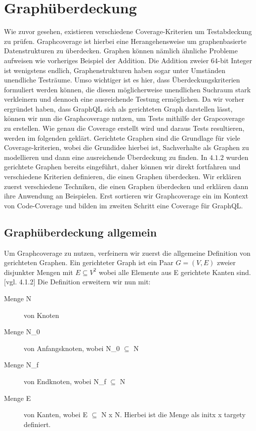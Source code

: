 \chapter{Graphüberdeckung}
\label{graphueberdeckung}

Wie zuvor gesehen, existieren verschiedene Coverage-Kriterien um Testabdeckung zu prüfen.
Graphcoverage ist hierbei eine Herangehensweise um graphenbasierte Datenstrukturen zu überdecken.
Graphen können nämlich ähnliche Probleme aufweisen wie vorheriges Beispiel der Addition.
Die Addition zweier 64-bit Integer ist wenigstens endlich, Graphenstrukturen haben sogar unter Umständen unendliche Testräume.
Umso wichtiger ist es hier, dass Überdeckungskriterien formuliert werden können, die diesen möglicherweise unendlichen Suchraum
stark verkleinern und dennoch eine ausreichende Testung ermöglichen.
Da wir vorher ergründet haben, dass GraphQL sich als gerichteten Graph darstellen lässt, können wir nun die Graphcoverage nutzen, um Tests mithilfe der Grapcoverage zu erstellen.
Wie genau die Coverage erstellt wird und daraus Tests resultieren, werden im folgenden geklärt.
Gerichtete Graphen sind die Grundlage für viele Coverage-kriterien, wobei die Grundidee hierbei ist,
Sachverhalte als Graphen zu modellieren und dann eine ausreichende Überdeckung zu finden. \cite[vgl. Software-testing S. 27 2.1]{software-testing}
In $4.1.2$ wurden gerichtete Graphen bereits eingeführt, daher können wir direkt fortfahren und verschiedene
Kriterien definieren, die einen Graphen überdecken.
Wir erklären zuerst verschiedene Techniken, die einen Graphen überdecken und erklären dann ihre Anwendung
an Beispielen.
Erst sortieren wir Graphcoverage ein im Kontext von Code-Coverage und bilden im zweiten Schritt eine Coverage für GraphQL\@.

\section{Graphüberdeckung allgemein}

Um Graphcoverage zu nutzen, verfeinern wir zuerst die allgemeine Definition von gerichteten Graphen.
Ein gerichteter Graph ist ein Paar $G = (V, E)$ zweier disjunkter Mengen mit $E \subseteq V^2$ wobei alle Elemente aus E gerichtete Kanten sind. [vgl. 4.1.2]
Die Definition erweitern wir nun mit:

\begin{description}
    \item[Menge N] von Knoten
    \item[Menge N_{0}] von Anfangsknoten, wobei N_{0} $\subseteq$ N
    \item[Menge N_{f}] von Endknoten, wobei N_{f} $\subseteq$ N
    \item[Menge E] von Kanten, wobei E $\subseteq$ N x N. Hierbei ist die Menge als init{x} x target{y} definiert.
\end{description}~\cite[2.1 Overview]{software-testing}

